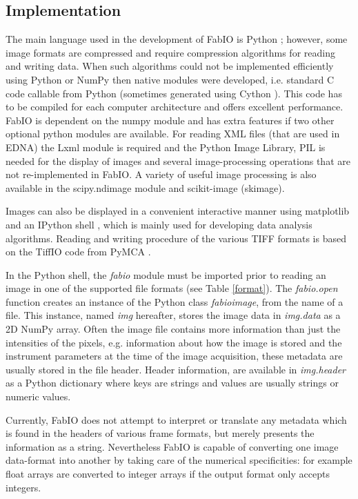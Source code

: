 \documentclass[preprint ]{iucr}
\begin{document}
\subsection{Implementation}
The main language used in the development of FabIO is Python \cite{python};
however, some image formats are compressed and require
compression algorithms for reading and writing data. 
When such algorithms could not be implemented efficiently using Python or NumPy 
then native modules were developed, i.e. standard C code callable from Python 
(sometimes generated using Cython \cite{cython}).
This code has to be compiled for each computer architecture and offers 
excellent performance.
FabIO is dependent on the numpy module and has extra features if two other
optional python modules are available. 
For reading XML files (that are used in EDNA) the Lxml module is required 
and the Python Image Library, PIL \cite{pil} is needed for the display of 
images and several image-processing operations that are not re-implemented 
in FabIO.
A variety of useful image processing is also available in the scipy.ndimage 
module \cite{scipy} and scikit-image (skimage)\cite{skimage}.


Images can also be displayed in a convenient interactive manner using
matplotlib \cite{matplotlib} and an IPython shell \cite{ipython}, which is
mainly used for developing data analysis algorithms.
Reading and writing procedure of the various TIFF \cite{tiff} formats is based
on the TiffIO code from PyMCA \cite{pymca}.

In the Python shell, the {\em fabio} module must be imported prior to reading an
image in one of the supported file formats (see Table \ref{format}).
The {\em fabio.open} function creates an instance of the Python class {\em fabioimage},
from the name of a file. This instance, named {\em img} hereafter, stores the
image data in {\em img.data} as a 2D NumPy array. Often the image file contains
more information than just the intensities of the pixels, e.g.
information about how the image is stored and the instrument parameters at the
time of the image acquisition, these metadata are usually stored in
the file header.
Header information, are available in {\em img.header} as a Python
dictionary where keys are strings and values are usually strings or
numeric values.

Currently, FabIO does not attempt to interpret or translate any metadata which
is found in the headers of various frame formats, but merely presents the
information as a string. Nevertheless FabIO is capable of converting one
image data-format into another by taking care of the numerical specificities: 
for example float arrays are converted to integer arrays if the output format only
accepts integers.
\end{document}
